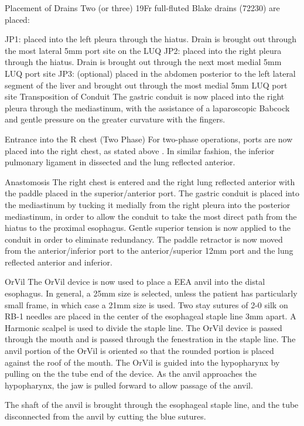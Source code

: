 \documentclass[
]{book}
\begin{document}
Placement of Drains
Two (or three) 19Fr full-fluted Blake drains (72230) are placed:

JP1: placed into the left pleura through the hiatus. Drain is brought out through the most lateral 5mm port site on the LUQ
JP2: placed into the right pleura through the hiatus. Drain is brought out through the next most medial 5mm LUQ port site
JP3: (optional) placed in the abdomen posterior to the left lateral segment of the liver and brought out through the most medial 5mm LUQ port site
Transposition of Conduit
The gastric conduit is now placed into the right pleura through the mediastinum, with the assistance of a laparoscopic Babcock and gentle pressure on the greater curvature with the fingers.

Entrance into the R chest (Two Phase)
For two-phase operations, ports are now placed into the right chest, as stated above . In similar fashion, the inferior pulmonary ligament in dissected and the lung reflected anterior.

Anastomosis
The right chest is entered and the right lung reflected anterior with the paddle placed in the superior/anterior port. The gastric conduit is placed into the mediastinum by tucking it medially from the right pleura into the posterior mediastinum, in order to allow the conduit to take the most direct path from the hiatus to the proximal esophagus. Gentle superior tension is now applied to the conduit in order to eliminate redundancy. The paddle retractor is now moved from the anterior/inferior port to the anterior/superior 12mm port and the lung reflected anterior and inferior.

OrVil
The OrVil device is now used to place a EEA anvil into the distal esophagus. In general, a 25mm size is selected, unless the patient has particularly small frame, in which case a 21mm size is used. Two stay sutures of 2-0 silk on RB-1 needles are placed in the center of the esophageal staple line 3mm apart. A Harmonic scalpel is used to divide the staple line. The OrVil device is passed through the mouth and is passed through the fenestration in the staple line. The anvil portion of the OrVil is oriented so that the rounded portion is placed against the roof of the mouth. The OrVil is guided into the hypopharynx by pulling on the the tube end of the device. As the anvil approaches the hypopharynx, the jaw is pulled forward to allow passage of the anvil.

The shaft of the anvil is brought through the esophageal staple line, and the tube disconnected from the anvil by cutting the blue sutures.
\end{document}
